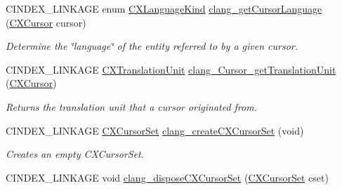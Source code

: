 \begin{DoxyCompactItemize}
\mbox{\label{group__CINDEX__CURSOR__MANIP_ga3729a27620b08e32e331a6c168e707b3}} 
C\+I\+N\+D\+E\+X\+\_\+\+L\+I\+N\+K\+A\+GE enum \hyperlink{group__CINDEX__CURSOR__MANIP_ga3abfddcec8a46e7156f37de661af3c14}{C\+X\+Language\+Kind} \hyperlink{group__CINDEX__CURSOR__MANIP_ga3729a27620b08e32e331a6c168e707b3}{clang\+\_\+get\+Cursor\+Language} (\hyperlink{structCXCursor}{C\+X\+Cursor} cursor)
\begin{DoxyCompactList}\small\item\em Determine the \char`\"{}language\char`\"{} of the entity referred to by a given cursor. \end{DoxyCompactList}\item 
\mbox{\label{group__CINDEX__CURSOR__MANIP_ga529f1504710a41ce358d4e8c3161848d}} 
C\+I\+N\+D\+E\+X\+\_\+\+L\+I\+N\+K\+A\+GE \hyperlink{group__CINDEX_gacdb7815736ca709ce9a5e1ec2b7e16ac}{C\+X\+Translation\+Unit} \hyperlink{group__CINDEX__CURSOR__MANIP_ga529f1504710a41ce358d4e8c3161848d}{clang\+\_\+\+Cursor\+\_\+get\+Translation\+Unit} (\hyperlink{structCXCursor}{C\+X\+Cursor})
\begin{DoxyCompactList}\small\item\em Returns the translation unit that a cursor originated from. \end{DoxyCompactList}\item 
\mbox{\label{group__CINDEX__CURSOR__MANIP_gaf77146bb2008dee2d9a74d56e669945f}} 
C\+I\+N\+D\+E\+X\+\_\+\+L\+I\+N\+K\+A\+GE \hyperlink{group__CINDEX__CURSOR__MANIP_gacca741976831fc313f80970cbf88307d}{C\+X\+Cursor\+Set} \hyperlink{group__CINDEX__CURSOR__MANIP_gaf77146bb2008dee2d9a74d56e669945f}{clang\+\_\+create\+C\+X\+Cursor\+Set} (void)
\begin{DoxyCompactList}\small\item\em Creates an empty C\+X\+Cursor\+Set. \end{DoxyCompactList}\item 
\mbox{\label{group__CINDEX__CURSOR__MANIP_gaf4178bd9a28549b94c83863a973f5e05}} 
C\+I\+N\+D\+E\+X\+\_\+\+L\+I\+N\+K\+A\+GE void \hyperlink{group__CINDEX__CURSOR__MANIP_gaf4178bd9a28549b94c83863a973f5e05}{clang\+\_\+dispose\+C\+X\+Cursor\+Set} (\hyperlink{group__CINDEX__CURSOR__MANIP_gacca741976831fc313f80970cbf88307d}{C\+X\+Cursor\+Set} cset)

\end{DoxyCompactItemize}
